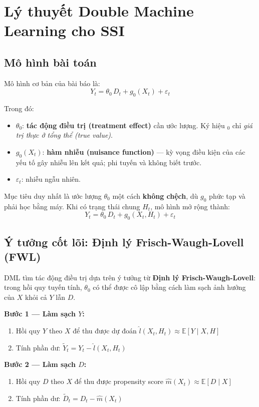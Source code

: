 \section{Lý thuyết Double Machine Learning cho SSI}

\subsection{Mô hình bài toán}

Mô hình cơ bản của bài báo là:
\[
    Y_t = \theta_0\, D_t + g_0(X_t) + \varepsilon_t
\]

Trong đó:
\begin{itemize}
    \item \(\theta_0\): \textbf{tác động điều trị (treatment effect)} cần ước lượng. Ký hiệu \(_0\) chỉ \textit{giá trị thực ở tổng thể (true value)}.
    \item \(g_0(X_t)\): \textbf{hàm nhiễu (nuisance function)} --- kỳ vọng điều kiện của các yếu tố gây nhiễu lên kết quả; phi tuyến và không biết trước.
    \item \(\varepsilon_t\): nhiễu ngẫu nhiên.
\end{itemize}

Mục tiêu duy nhất là ước lượng \(\theta_0\) một cách \textbf{không chệch}, dù \(g_0\) phức tạp và phải học bằng máy. Khi có trạng thái chung \(H_t\), mô hình mở rộng thành:
\[
    Y_t = \theta_0\, D_t + g_0(X_t, H_t) + \varepsilon_t
\]

\subsection{\'{Y} tưởng cốt lõi: Định lý Frisch-Waugh-Lovell (FWL)}

DML tìm tác động điều trị dựa trên ý tưởng từ \textbf{Định lý Frisch-Waugh-Lovell}: trong hồi quy tuyến tính, \(\theta_0\) có thể được cô lập bằng cách làm sạch ảnh hưởng của \(X\) khỏi cả \(Y\) lẫn \(D\).

\textbf{Bước 1 --- Làm sạch \(Y\):}
\begin{enumerate}
    \item Hồi quy \(Y\) theo \(X\) để thu được dự đoán \(\hat{l}(X_t, H_t) \approx \mathbb{E}[Y \mid X, H]\)
    \item Tính phần dư: \(\tilde{Y}_t = Y_t - \hat{l}(X_t, H_t)\)
\end{enumerate}

\textbf{Bước 2 --- Làm sạch \(D\):}
\begin{enumerate}
    \item Hồi quy \(D\) theo \(X\) để thu được propensity score \(\hat{m}(X_t) \approx \mathbb{E}[D \mid X]\)
    \item Tính phần dư: \(\tilde{D}_t = D_t - \hat{m}(X_t)\)
\end{enumerate}

